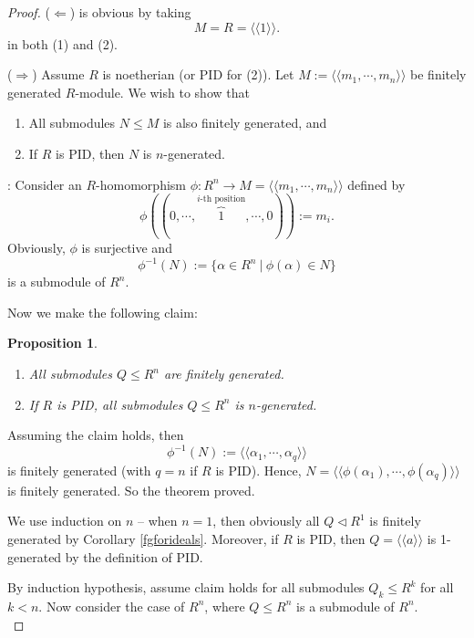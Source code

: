 \documentclass[11pt,openany]{book}
\theoremstyle{plain}
\newtheorem{claim}[claim]{Proposition}
\theoremstyle{definition}
\theoremstyle{remark}
\begin{document}
\begin{proof}
    ($\Leftarrow$) is obvious by taking
    $$M=R=\langle\langle 1\rangle\rangle.$$
    in both (1) and (2).

    \medskip
    ($\Rightarrow$) Assume $R$ is noetherian (or PID for (2)). Let $M:=\langle\langle m_1,\cdots,m_n\rangle\rangle$ be finitely generated $R$-module. We wish to show that 
    \begin{enumerate}
        \item All submodules $N\leq M$ is also finitely generated, and 
        \item If $R$ is PID, then $N$ is $n$-generated.
    \end{enumerate}
    

    : Consider an $R$-homomorphism $\phi:R^n\to M = \langle\langle m_1,\cdots,m_n\rangle\rangle$ defined by
    $$\phi((0,\cdots,\overbrace{1}^{i\text{-th position}},\cdots,0)):=m_i.$$
    Obviously, $\phi$ is surjective and
    $$\phi^{-1}(N):=\{\alpha\in R^n \ |\ \phi(\alpha)\in N\}$$
    is a submodule of $R^n$.
    
    \medskip
    Now we make the following claim:
    \begin{claim}\
        \begin{enumerate}
            \item All submodules $Q \leq R^n$ are finitely generated.
            \item If $R$ is PID, all submodules $Q\leq R^n$ is $n$-generated.
        \end{enumerate}
    \end{claim}
    Assuming the claim holds, then 
    $$\phi^{-1}(N):=\langle\langle\alpha_1,\cdots,\alpha_q\rangle\rangle$$ 
    is finitely generated (with $q=n$ if $R$ is PID). Hence, $N=\langle\langle\phi(\alpha_1),\cdots,\phi(\alpha_q)\rangle\rangle$
    is finitely generated. So the theorem proved.

    \bigskip
    We use induction on $n$ -- when $n=1$, then obviously all $Q\lhd R^1$ is finitely generated by Corollary \ref{fgforideals}. Moreover, if $R$ is PID, then $Q=\langle\langle a\rangle\rangle$ is 1-generated by the definition of PID.

    \medskip
    By induction hypothesis, assume claim holds for all submodules $Q_k\leq R^k$ for all $k<n$. Now consider the case of $R^n$, where $Q\leq R^n$ is a submodule of $R^n$. \\
    

\end{proof}
\end{document}
